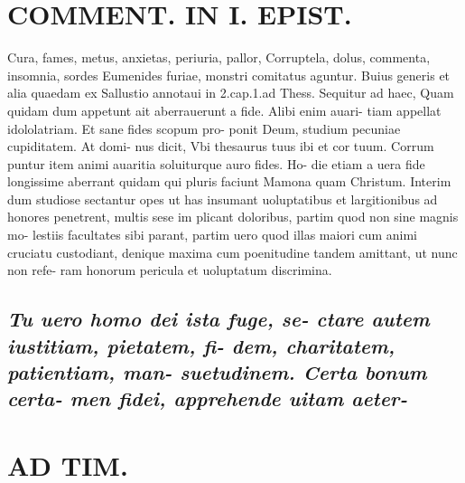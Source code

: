 \documentclass{article}
\begin{document}
\begin{pages}
\section*{COMMENT. IN I. EPIST. }\pstart Cura, fames, metus, anxietas, periuria, pallor, Corruptela, dolus, commenta, insomnia, sordes Eumenides furiae, monstri comitatus aguntur. Buius generis et alia quaedam ex Sallustio annotaui in 2.cap.1.ad Thess. Sequitur ad haec, Quam quidam dum appetunt ait aberrauerunt a fide. Alibi enim auari- tiam appellat idololatriam. Et sane fides scopum pro- ponit Deum, studium pecuniae cupiditatem. At domi- nus dicit, Vbi thesaurus tuus ibi et cor tuum. Corrum puntur item animi auaritia soluiturque auro fides. Ho- die etiam a uera fide longissime aberrant quidam qui pluris faciunt Mamona quam Christum. Interim dum studiose sectantur opes ut has insumant uoluptatibus et largitionibus ad honores penetrent, multis sese im plicant doloribus, partim quod non sine magnis mo- lestiis facultates sibi parant, partim uero quod illas maiori cum animi cruciatu custodiant, denique maxima cum poenitudine tandem amittant, ut nunc non refe- ram honorum pericula et uoluptatum discrimina.  \pend
{}
{}
\subsection*{\textit{Tu uero homo dei ista fuge, se- ctare autem iustitiam, pietatem, fi- dem, charitatem, patientiam, man- suetudinem. Certa bonum certa- men fidei, apprehende uitam aeter- }}
\section*{AD TIM. }
\marginpar{[ p.170 ]}
{}

\end{pages}
\end{document}
